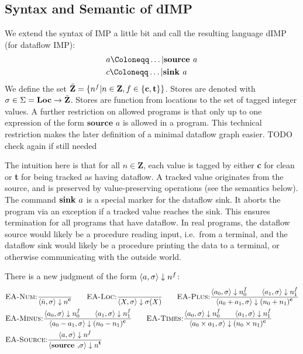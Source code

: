 \subsection{Syntax and Semantic of dIMP}
We extend the syntax of IMP a little bit
and call the resulting language dIMP (for dataflow IMP):
\begin{align*}
    &a \Coloneqq \dots | \defaultsource\\
    &c \Coloneqq \dots | \defaultsink\\
\end{align*}
We define the set $\tilde{\textbf{Z}} =\{\flagged{} | n \in \textbf{Z}, f \in \{\textbf{c}, \textbf{t}\}\}$.
Stores are denoted with $\store \in \Sigma = \Loc \to \tilde{\textbf{Z}}$.
Stores are function from locations to the set of tagged integer
values.
A further restriction on allowed programs is that only up to one expression
of the form $\textbf{source } a$ is allowed in a program.
This technical restriction makes the later definition of a minimal dataflow graph
easier.
TODO check again if still needed

The intuition here is that for all $n \in \textbf{Z}$, 
each value is tagged by either \textbf{c} for clean or \textbf{t} for being tracked
as having dataflow.
A tracked value originates from the source, and is preserved by value-preserving
operations (see the semantics below).
The command $\defaultsink$ is a special marker for the dataflow sink.
It aborts the program via an exception if a tracked value reaches the sink.
This ensures termination for all programs that have dataflow.
In real programs, the dataflow source would likely be a procedure reading input,
i.e.\ from a terminal, and the dataflow sink would likely be a procedure 
printing the data to a terminal, or otherwise communicating with the outside world.


There is a new judgment of the form 
$\bigstep{a}{\sigma}{\flagged{}}$:
\begin{align*}
    &\bsrule{EA-Num}{}{\bigstep{\literalint}{\store}{\clean}} \qquad
    \bsrule{EA-Loc}{}{\bigstep{X}{\store}{\store(X)}}\qquad
    \bsrule{EA-Plus}
    {\bigstep{a_0}{\store}{\flagged[n_0]}
    \qquad \bigstep{a_1}{\store}{\flagged[n_1]}}
    {\bigstep{a_0+a_1}{\store}{\clean[(n_0+n_1)]}}\\
    &\bsrule{EA-Minus}
    {\bigstep{a_0}{\store}{\flagged[n_0]}
    \qquad \bigstep{a_1}{\store}{\flagged[n_1]}}
    {\bigstep{a_0-a_1}{\store}{\clean[(n_0-n_1)]}} \qquad
    \bsrule{EA-Times}
    {\bigstep{a_0}{\store}{\flagged[n_0]}
    \qquad \bigstep{a_1}{\store}{\flagged[n_1]}}
    {\bigstep{a_0 \times a_1}{\store}{\clean[(n_0 \times n_1)]}}\\
    &\bsrule{EA-Source}{\bigstep{a}{\store}{\flagged}}
    {\bigstep{\source}{\store}{\tracked{}}}
\end{align*}


